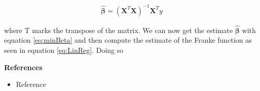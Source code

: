 \documentclass[12pt,a4paper]{article}
\begin{document}
\begin{equation}\label{eq:minBeta}
\begin{aligned}
\hat{\boldsymbol{\beta}} = (\textbf{X}^T\textbf{X})^{-1}\textbf{X}^Ty
\end{aligned}
\end{equation}

\noindent where T marks the transpose of the matrix. We can now get the estimate $\hat{\boldsymbol{\beta}}$ with equation \ref{eq:minBeta} and then compute the estimate of the Franke function as seen in equation \ref{eq:LinReg}. Doing so 

\newpage

\begin{center}
\Large{\textbf{References}}
\end{center}

\begin{itemize}
  \item Reference
\end{itemize}
\end{document}
